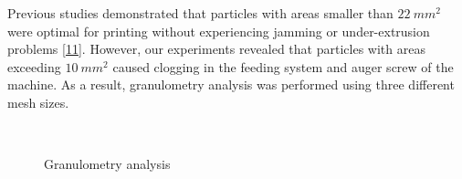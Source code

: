 \documentclass[
]{article}
\begin{document}
Previous studies demonstrated that particles with areas smaller than
\(22~mm^{2}\) were optimal for printing without experiencing jamming or
under-extrusion problems \protect\hyperlink{ref-woern2018}{{[}11{]}}.
However, our experiments revealed that particles with areas exceeding
\(10~mm^{2}\) caused clogging in the feeding system and auger screw of
the machine. As a result, granulometry analysis was performed using
three different mesh sizes.

\begin{figure}

\begin{minipage}[t]{0.57\linewidth}

{\centering 


\caption{\label{fig-granulometry}Granulometry analysis}

}

\end{minipage}%
%
\begin{minipage}[t]{0.03\linewidth}

{\centering 

~

}

\end{minipage}%
%
\begin{minipage}[t]{0.40\linewidth}


\end{minipage}
\end{figure}
\end{document}

